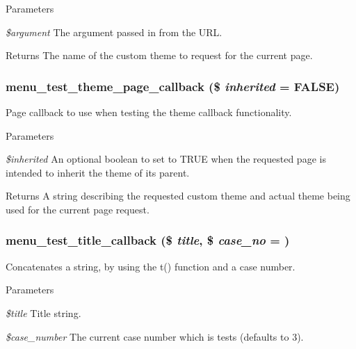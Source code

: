 \begin{DoxyParams}{Parameters}
\item[{\em \$argument}]The argument passed in from the URL. \end{DoxyParams}
\begin{DoxyReturn}{Returns}
The name of the custom theme to request for the current page. 
\end{DoxyReturn}
\hypertarget{menu__test_8module_acd99960b64737e41ca0c5bad256db30f}{
\subsubsection[{menu\_\-test\_\-theme\_\-page\_\-callback}]{\setlength{\rightskip}{0pt plus 5cm}menu\_\-test\_\-theme\_\-page\_\-callback (\$ {\em inherited} = {\ttfamily FALSE})}}
\label{menu__test_8module_acd99960b64737e41ca0c5bad256db30f}
Page callback to use when testing the theme callback functionality.


\begin{DoxyParams}{Parameters}
\item[{\em \$inherited}]An optional boolean to set to TRUE when the requested page is intended to inherit the theme of its parent. \end{DoxyParams}
\begin{DoxyReturn}{Returns}
A string describing the requested custom theme and actual theme being used for the current page request. 
\end{DoxyReturn}
\hypertarget{menu__test_8module_aba499d6eb2bae0d26c29b18d498ac79c}{
\subsubsection[{menu\_\-test\_\-title\_\-callback}]{\setlength{\rightskip}{0pt plus 5cm}menu\_\-test\_\-title\_\-callback (\$ {\em title}, \/  \$ {\em case\_\-no} = {})}}
\label{menu__test_8module_aba499d6eb2bae0d26c29b18d498ac79c}
Concatenates a string, by using the t() function and a case number.


\begin{DoxyParams}{Parameters}
\item[{\em \$title}]Title string. \item[{\em \$case\_\-number}]The current case number which is tests (defaults to 3). \end{DoxyParams}
